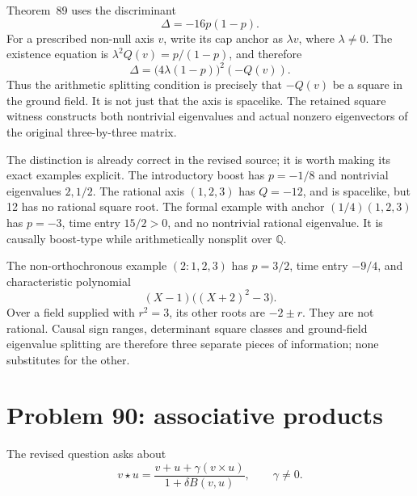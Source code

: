 \documentclass[11pt]{article}
\newcommand{\Q}{\mathbb Q}
\theoremstyle{remark}
\begin{document}
Theorem~89 uses the discriminant
\[
 \Delta=-16p(1-p).
\]
For a prescribed non-null axis \(v\), write its cap anchor as \(\lambda v\),
where \(\lambda\ne0\). The existence equation is
\(\lambda^2Q(v)=p/(1-p)\), and therefore
\[
 \Delta=\bigl(4\lambda(1-p)\bigr)^2(-Q(v)).
\]
Thus the arithmetic splitting condition is precisely that \(-Q(v)\) be
a square in the ground field. It is not just that the axis is spacelike.
The retained square witness constructs both nontrivial eigenvalues and
actual nonzero eigenvectors of the original three-by-three matrix.

The distinction is already correct in the revised source; it is worth making
its exact examples explicit. The introductory boost has \(p=-1/8\) and
nontrivial eigenvalues \(2,1/2\). The rational axis \((1,2,3)\) has
\(Q=-12\), and is spacelike, but 12 has no rational square root. The
formal example with anchor \((1/4)(1,2,3)\) has \(p=-3\), time entry
\(15/2>0\), and no nontrivial rational eigenvalue. It is causally
boost-type while arithmetically nonsplit over \(\Q\).

The non-orthochronous example \((2:1,2,3)\) has \(p=3/2\), time entry
\(-9/4\), and characteristic polynomial
\[
 (X-1)\bigl((X+2)^2-3\bigr).
\]
Over a field supplied with \(r^2=3\), its other roots are \(-2\pm r\).
They are not rational. Causal sign ranges, determinant square classes and
ground-field eigenvalue splitting are therefore three separate pieces of
information; none substitutes for the other.

\section{Problem 90: associative products}

The revised question asks about
\[
 v\star u=\frac{v+u+\gamma(v\times u)}{1+\delta B(v,u)},
 \qquad\gamma\ne0.
\]
\end{document}
